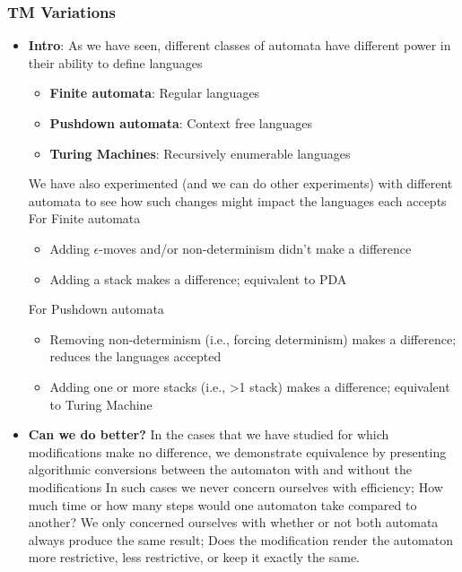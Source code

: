 \documentclass{report}
\begin{document}
    \pagebreak 
    \subsubsection{TM Variations}
    \begin{itemize}
        \item \textbf{Intro}: As we have seen, different classes of automata have different power in their ability to define languages
            \begin{itemize}
                \item \textbf{Finite automata}: Regular languages
                \item \textbf{Pushdown automata}: Context free languages
                \item  \textbf{Turing Machines}: Recursively enumerable languages
            \end{itemize}
            \bigbreak \noindent 
            We have also experimented (and we can do other experiments) with different automata to see how such changes might impact the languages each accepts
            \bigbreak \noindent 
            For Finite automata
            \begin{itemize}
                \item Adding $\epsilon$-moves and/or non-determinism didn't make a difference
                \item Adding a stack makes a difference; equivalent to PDA
            \end{itemize}
            \bigbreak \noindent 
            For Pushdown automata
            \begin{itemize}
                \item Removing non-determinism (i.e., forcing determinism) makes a difference; reduces the languages accepted
                \item Adding one or more stacks (i.e., >1 stack) makes a difference; equivalent to Turing Machine
            \end{itemize}
        \item \textbf{Can we do better?} In the cases that we have studied for which modifications make no difference, we demonstrate equivalence by presenting algorithmic conversions between the automaton with and without the modifications
            \bigbreak \noindent 
            In such cases we never concern ourselves with efficiency; How much time or how many steps would one automaton take compared to another?
            \bigbreak \noindent 
            We only concerned ourselves with whether or not both automata always produce the same result; Does the modification render the automaton more restrictive, less restrictive, or keep it exactly the same.

\end{itemize}
\end{document}
